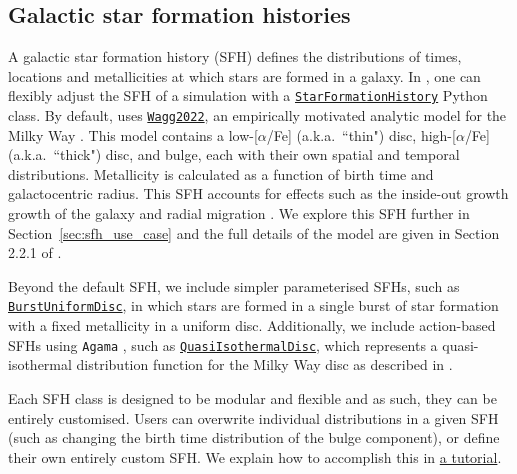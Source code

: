\documentclass[twocolumn, twocolappendix, oneside, linenumbers]{aastex631}
\newcommand{\codeLink}[2]{{\href{https://cogsworth.readthedocs.io/en/latest/api/cogsworth.#2.#1.html}{\color{codecolour} \texttt{#1}}}}
\newcommand{\tutorialLink}[2]{\href{#1}{{\color{codecolour}#2}}}
\begin{document}
\subsection{Galactic star formation histories}\label{sec:galactic_SFH}

A galactic star formation history (SFH) defines the distributions of times, locations and metallicities at which stars are formed in a galaxy. In \cogsworth, one can flexibly adjust the SFH of a simulation with a \codeLink{StarFormationHistory}{sfh} Python class. By default, \cogsworth uses \codeLink{Wagg2022}{sfh}, an empirically motivated analytic model for the Milky Way \citep{Wagg+2022}. This model contains a low-[$\alpha$/Fe] (a.k.a.~``thin")  disc, high-[$\alpha$/Fe] (a.k.a.~``thick") disc, and bulge, each with their own spatial and temporal distributions. Metallicity is calculated as a function of birth time and galactocentric radius. This SFH accounts for effects such as the inside-out growth growth of the galaxy and radial migration \citep{Frankel+2018, Frankel+2019:2019ApJ...884...99F}. We explore this SFH further in Section~\ref{sec:sfh_use_case} and the full details of the model are given in Section 2.2.1 of \citet{Wagg+2022}.

Beyond the default SFH, we include simpler parameterised SFHs, such as \codeLink{BurstUniformDisc}{sfh}, in which stars are formed in a single burst of star formation with a fixed metallicity in a uniform disc. Additionally, we include action-based SFHs using \texttt{Agama} \citep{2019MNRAS.482.1525V}, such as \codeLink{QuasiIsothermalDisc}{sfh}, which represents a quasi-isothermal distribution function for the Milky Way disc as described in \citet{Sanders+2015:2015MNRAS.449.3479S}.

Each SFH class is designed to be modular and flexible and as such, they can be entirely customised. Users can overwrite individual distributions in a given SFH (such as changing the birth time distribution of the bulge component), or define their own entirely custom SFH. We explain how to accomplish this in \tutorialLink{https://cogsworth.readthedocs.io/en/latest/tutorials/pop_settings/initial_galaxy.html}{a tutorial}.
\end{document}
